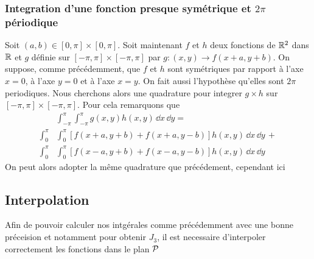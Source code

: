 \documentclass[10pt]{article}
\begin{document}
\begin{multicols}{2}
\vspace*{11pt}



\subsubsection{Integration d'une fonction presque symétrique et $2\pi$ périodique}

Soit $(a,b) \in [0,\pi]\times [0,\pi]$. Soit maintenant $f$ et $h$ deux fonctions de $\mathbb{R}^2$ dans $\mathbb{R}$ et  $g$ définie sur  $[-\pi, \pi] \times [-\pi, \pi]$ par $g : (x,y) \rightarrow f(x+a, y+b)$. On suppose, comme précédemment, que $f$ et $h$ sont symétriques par rapport à l'axe $x=0$, à l'axe $y=0$ et à l'axe $x=y$. On fait aussi l'hypothèse qu'elles sont $2\pi$ periodiques. Nous cherchons alors une quadrature pour integrer $g\times h$ sur $[-\pi, \pi] \times [-\pi, \pi]$. Pour cela remarquons que
\begin{equation}
\begin{split}
 & \int_{-\pi}^{\pi} \int_{-\pi}^{\pi} g(x,y) h(x,y) \,  \dd x \, \dd y  = \\
 \int_{0}^{\pi} & \int_{0}^{\pi} [f(x+a, y+b) + f(x+a, y-b)] h(x,y) \, \dd x \, \dd y \, + \\ 
\int_{0}^{\pi} & \int_{0}^{\pi} [f(x-a, y+b) + f(x-a, y-b)] h(x,y)  \, \dd x \, \dd y 
\end{split}
\end{equation}
On peut alors adopter la même quadrature que précédement, cependant ici 

\vspace*{11pt}


\subsection{Interpolation}

Afin de pouvoir calculer nos intgérales comme précédemment avec une bonne préceision et notamment pour obtenir $J_3$, il est necessaire d'interpoler correctement les fonctions dans le plan $\mathcal{P}$





\newpage
\null
\newpage

\appendix





















\end{multicols}
\end{document}
